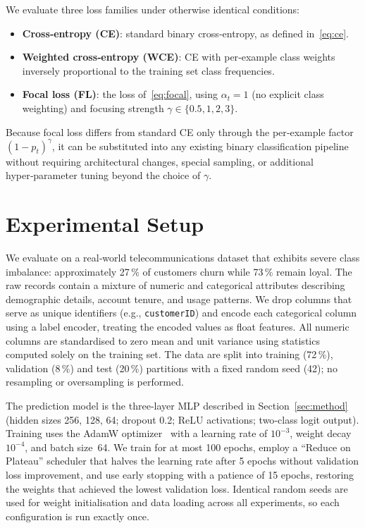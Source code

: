 \documentclass[11pt,a4paper]{article}
\begin{document}
We evaluate three loss families under otherwise identical conditions:
\begin{itemize}
\item \textbf{Cross‑entropy (CE)}: standard binary cross‑entropy, as defined in~\eqref{eq:ce}.
\item \textbf{Weighted cross‑entropy (WCE)}: CE with per‑example class weights inversely proportional to the training set class frequencies.
\item \textbf{Focal loss (FL)}: the loss of~\eqref{eq:focal}, using $\alpha_t=1$ (no explicit class weighting) and focusing strength $\gamma \in \{0.5, 1, 2, 3\}$.
\end{itemize}

Because focal loss differs from standard CE only through the per‑example factor $(1-p_t)^\gamma$, it can be substituted into any existing binary classification pipeline without requiring architectural changes, special sampling, or additional hyper‑parameter tuning beyond the choice of $\gamma$.

\section{Experimental Setup}
\label{sec:setup}
We evaluate on a real‑world telecommunications dataset that exhibits severe class imbalance: approximately 27\,\% of customers churn while 73\,\% remain loyal.
The raw records contain a mixture of numeric and categorical attributes describing demographic details, account tenure, and usage patterns.
We drop columns that serve as unique identifiers (e.g., \texttt{customerID}) and encode each categorical column using a label encoder, treating the encoded values as float features.
All numeric columns are standardised to zero mean and unit variance using statistics computed solely on the training set.
The data are split into training (72\,\%), validation (8\,\%) and test (20\,\%) partitions with a fixed random seed (42); no resampling or oversampling is performed.

The prediction model is the three‑layer MLP described in Section~\ref{sec:method} (hidden sizes 256, 128, 64; dropout 0.2; ReLU activations; two‑class logit output).
Training uses the AdamW optimizer~\cite{kingma2014adam} with a learning rate of $10^{-3}$, weight decay $10^{-4}$, and batch size~64.
We train for at most 100 epochs, employ a ``Reduce on Plateau'' scheduler that halves the learning rate after 5 epochs without validation loss improvement, and use early stopping with a patience of 15 epochs, restoring the weights that achieved the lowest validation loss.
Identical random seeds are used for weight initialisation and data loading across all experiments, so each configuration is run exactly once.
\end{document}
